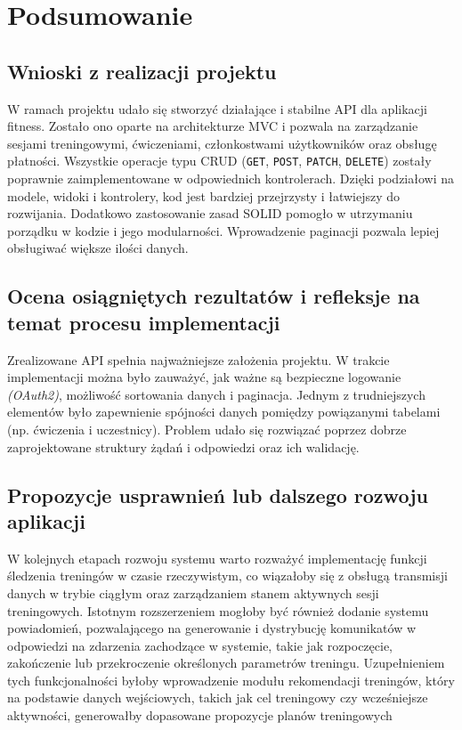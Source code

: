 \documentclass[../../spr.tex]{subfiles}
\begin{document}
\newpage
\section{Podsumowanie}

\subsection{Wnioski z realizacji projektu}
W ramach projektu udało się stworzyć działające i stabilne API dla aplikacji fitness.
Zostało ono oparte na architekturze MVC i pozwala na zarządzanie sesjami treningowymi,
ćwiczeniami, członkostwami użytkowników oraz obsługę płatności.
Wszystkie operacje typu CRUD (\texttt{GET}, \texttt{POST}, \texttt{PATCH},
\texttt{DELETE}) zostały poprawnie zaimplementowane w odpowiednich kontrolerach.
Dzięki podziałowi na modele, widoki i kontrolery, kod jest bardziej przejrzysty i
łatwiejszy do rozwijania.
Dodatkowo zastosowanie zasad SOLID pomogło w utrzymaniu porządku w kodzie i
jego modularności. Wprowadzenie paginacji pozwala lepiej obsługiwać większe
ilości danych.

\subsection{Ocena osiągniętych rezultatów i refleksje na temat procesu implementacji}
Zrealizowane API spełnia najważniejsze założenia projektu.
W trakcie implementacji można było zauważyć, jak ważne są bezpieczne logowanie \textit{(OAuth2)},
możliwość sortowania danych i paginacja.
Jednym z trudniejszych elementów było zapewnienie spójności danych pomiędzy
powiązanymi tabelami (np. ćwiczenia i uczestnicy).
Problem udało się rozwiązać poprzez dobrze zaprojektowane struktury żądań i
odpowiedzi oraz ich walidację.

\subsection{Propozycje usprawnień lub dalszego rozwoju aplikacji}
W kolejnych etapach rozwoju systemu warto rozważyć implementację funkcji śledzenia treningów
w czasie rzeczywistym, co wiązałoby się z obsługą transmisji danych w trybie ciągłym
oraz zarządzaniem stanem aktywnych sesji treningowych.
Istotnym rozszerzeniem mogłoby być również dodanie systemu powiadomień,
pozwalającego na generowanie i dystrybucję komunikatów w odpowiedzi na zdarzenia
zachodzące w systemie, takie jak rozpoczęcie, zakończenie lub przekroczenie określonych
parametrów treningu. Uzupełnieniem tych funkcjonalności byłoby wprowadzenie modułu
rekomendacji treningów, który na podstawie danych wejściowych, takich jak cel treningowy
czy wcześniejsze aktywności, generowałby dopasowane propozycje planów treningowych
\end{document}
